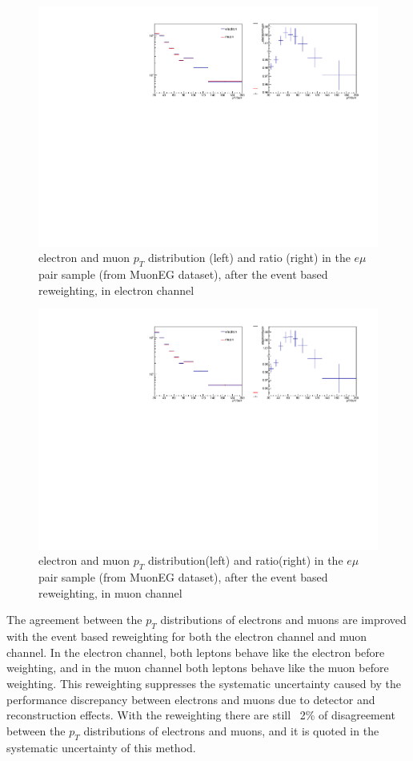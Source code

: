 \begin{figure}[htbp]
\begin{center}
\includegraphics[width=0.95\linewidth]{figures/nonresmuelptel.pdf}
\caption{electron and muon $p_T$ distribution (left) and ratio (right) in the $e\mu$ pair sample (from MuonEG dataset), after the event based reweighting, in electron channel}
\label{fig:nonresmuelptel}
\end{center}
\end{figure}

\begin{figure}[htbp]
\begin{center}
\includegraphics[width=0.72\linewidth]{figures/nonresmuelptmu.pdf}
\caption{electron and muon $p_T$ distribution(left) and ratio(right) in the $e\mu$ pair sample (from MuonEG dataset), after the event based reweighting, in muon channel}
\label{fig:nonresmuelptmu}
\end{center}
\end{figure}

\vspace{0.3cm}
The agreement between the $p_T$ distributions of electrons and muons are improved with the event based reweighting for both the electron channel and muon channel. In the electron channel, both leptons behave like the electron before weighting, and in the muon channel both leptons behave like the muon before weighting. This reweighting suppresses the systematic uncertainty caused by the performance discrepancy between electrons and muons due to detector and reconstruction effects. With the reweighting there are still ~2\% of disagreement between the $p_T$ distributions of electrons and muons, and it is quoted in the systematic uncertainty of this method.

